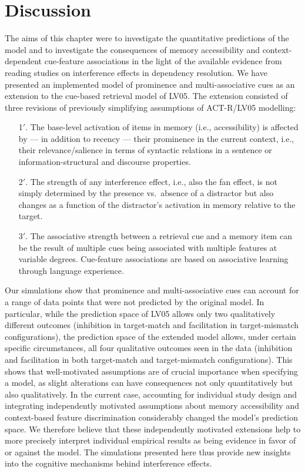 \documentclass{cambridge7A}\usepackage[]{graphicx}\usepackage[]{color}
\begin{document}
\section{Discussion}

The aims of this chapter were to investigate the quantitative predictions of the \cite{LewisVasishth2005} model and to investigate the consequences of memory accessibility and context-dependent cue-feature associations in the light of the available evidence from reading studies on interference effects in dependency resolution.
We have presented an implemented model of prominence and multi-associative cues as an extension to the cue-based retrieval model of LV05. 
The extension consisted of three revisions of previously simplifying assumptions of ACT-R/LV05 modelling:

\begin{enumerate}
  \item[1$'$.] The base-level activation of items in memory (i.e., accessibility) is affected by --- in addition to recency --- their prominence in the current context, i.e., their  relevance/salience in terms of syntactic relations in a sentence or information-structural and discourse properties.
  \item[2$'$.] The strength of any interference effect, i.e., also the fan effect, is not simply determined by the presence vs.\ absence of a distractor but also changes as a function of the distractor's activation in memory relative to the target.
  \item[3$'$.] The associative strength between a retrieval cue and a memory item can be the result of multiple cues being associated with multiple features at variable degrees. Cue-feature associations are based on associative learning through language experience. 
\end{enumerate}

Our simulations show that prominence and multi-associative cues can account for a range of data points that were not predicted by the original model. 
In particular, while the prediction space of LV05 allows only two qualitatively different outcomes (inhibition in
target-match and facilitation in 
 target-mismatch configurations), the prediction space of the extended model allows, under certain specific circumstances, all four qualitative outcomes seen in the data (inhibition and facilitation in both target-match and target-mismatch configurations). 
This shows that well-motivated assumptions are of crucial importance when specifying a model, as slight alterations can have consequences not only quantitatively but also qualitatively.
In the current case, accounting for individual study design and integrating independently motivated assumptions about memory accessibility and context-based feature discrimination considerably changed the model's prediction space.
We therefore believe that these independently motivated extensions help to more precisely interpret individual empirical results as being evidence in favor of or against the model. The simulations presented here thus provide new insights into the cognitive mechanisms behind interference effects.
\end{document}

